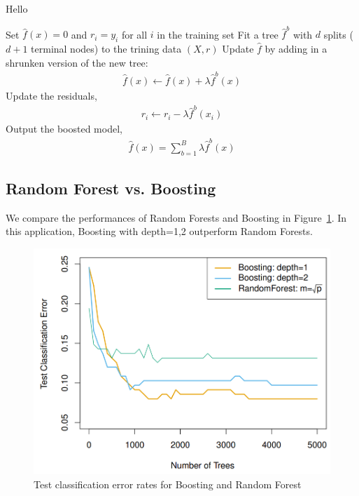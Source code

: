 \documentclass[10pt,a4paper]{article}
\begin{document}
\begin{algorithm}
\caption{Hello}
\begin{algorithmic}[1]
	\State Set $\hat{f}(x)=0$ and $r_i=y_i$ for all $i$ in the training set
		\State Fit a tree $\hat{f}^b$ with $d$ splits ($d+1$ terminal nodes) to the trining data $(X,r)$
		\State Update $\hat{f}$ by adding in a shrunken version of the new tree:
		\begin{align*}
			\hat{f}(x) \leftarrow \hat{f}(x)+\lambda\hat{f}^b(x)
		\end{align*}
		\State Update the residuals,
		\begin{align*}
			r_i \leftarrow r_i - \lambda \hat{f}^b(x_i)
		\end{align*}
	\EndFor
	\State Output the boosted model,
	\begin{align*}
		\hat{f}(x)=\sum_{b=1}^B\lambda\hat{f}^b(x)
	\end{align*}
\EndProcedure
\end{algorithmic}
\end{algorithm}

\pagebreak
\subsection{Random Forest vs. Boosting}
We compare the performances of Random Forests and Boosting in Figure~\ref{accuracy}. In this application, Boosting with depth=1,2 outperform Random Forests.

\begin{figure}[H]
\centering
\includegraphics[scale=.6]{tree_extension.png}
\caption{Test classification error rates for Boosting and Random Forest}
\label{accuracy}
\end{figure}
\end{document}
